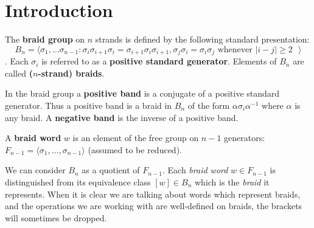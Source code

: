 \documentclass[12pt]{thesis}
\begin{document}
% 

\tableofcontents
\listoffigures

\mainmatter

\chapter{Introduction}

\begin{definition}
    The \textbf{braid group} on $n$ strands is defined by the following standard presentation:
    \[
    B_{n} = \langle \sigma_{1}, \ldots \sigma_{n - 1} \colon \sigma_{i}\sigma_{i + 1}\sigma_{i} = \sigma_{i + 1} \sigma_{i} \sigma_{i + 1},
     \sigma_{j}\sigma_{i} = \sigma_{i}\sigma_{j} \text{ whenever $|i - j| \geq 2$ } \rangle
    \].
    Each $\sigma_{i}$ is referred to as a \textbf{positive standard generator}.
    Elements of $B_{n}$ are called \textbf{($n$-strand) braids}.
\end{definition}

\begin{definition}
    In the braid group a \textbf{positive band} is a conjugate of a positive standard generator.
    Thus a positive band is a braid in $B_{n}$ of the form $\alpha \sigma_{i} \alpha^{-1}$ 
    where $\alpha$ is any braid.
    A \textbf{negative band} is the inverse of a positive band.
\end{definition}

\begin{definition}
    A \textbf{braid word} $w$ is an element of the free group on $n-1$ generators: $F_{n-1} = \langle \sigma_{1}, \ldots, \sigma_{n-1} \rangle$ (assumed to be reduced).
\end{definition}

We can consider $B_{n}$ as a quotient of $F_{n-1}$.
Each \textit{braid word} $w \in F_{n-1}$ is distinguished from its equivalence class $[w] \in B_{n}$
which is the \textit{braid} it represents.
When it is clear we are talking about words which represent braids, and
the operations we are working with
are well-defined on braids, the brackets will sometimes be dropped.
\end{document}
